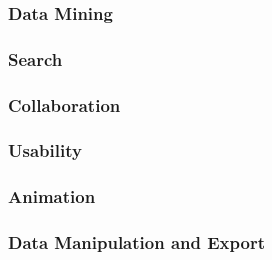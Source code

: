 \subsubsection{Data Mining}

\subsubsection{Search}

\subsubsection{Collaboration}

\subsubsection{Usability}

\subsubsection{Animation}

\subsubsection{Data Manipulation and Export}
